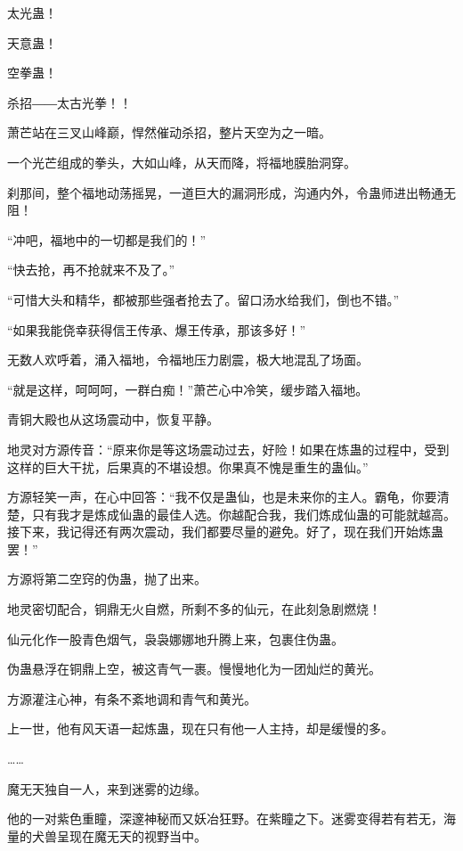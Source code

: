 
\begin{this_body}

太光蛊！

天意蛊！

空拳蛊！

杀招――太古光拳！！

萧芒站在三叉山峰巅，悍然催动杀招，整片天空为之一暗。

一个光芒组成的拳头，大如山峰，从天而降，将福地膜胎洞穿。

刹那间，整个福地动荡摇晃，一道巨大的漏洞形成，沟通内外，令蛊师进出畅通无阻！

“冲吧，福地中的一切都是我们的！”

“快去抢，再不抢就来不及了。”

“可惜大头和精华，都被那些强者抢去了。留口汤水给我们，倒也不错。”

“如果我能侥幸获得信王传承、爆王传承，那该多好！”

无数人欢呼着，涌入福地，令福地压力剧震，极大地混乱了场面。

“就是这样，呵呵呵，一群白痴！”萧芒心中冷笑，缓步踏入福地。

青铜大殿也从这场震动中，恢复平静。

地灵对方源传音：“原来你是等这场震动过去，好险！如果在炼蛊的过程中，受到这样的巨大干扰，后果真的不堪设想。你果真不愧是重生的蛊仙。”

方源轻笑一声，在心中回答：“我不仅是蛊仙，也是未来你的主人。霸龟，你要清楚，只有我才是炼成仙蛊的最佳人选。你越配合我，我们炼成仙蛊的可能就越高。接下来，我记得还有两次震动，我们都要尽量的避免。好了，现在我们开始炼蛊罢！”

方源将第二空窍的伪蛊，抛了出来。

地灵密切配合，铜鼎无火自燃，所剩不多的仙元，在此刻急剧燃烧！

仙元化作一股青色烟气，袅袅娜娜地升腾上来，包裹住伪蛊。

伪蛊悬浮在铜鼎上空，被这青气一裹。慢慢地化为一团灿烂的黄光。

方源灌注心神，有条不紊地调和青气和黄光。

上一世，他有风天语一起炼蛊，现在只有他一人主持，却是缓慢的多。

……

魔无天独自一人，来到迷雾的边缘。

他的一对紫色重瞳，深邃神秘而又妖冶狂野。在紫瞳之下。迷雾变得若有若无，海量的犬兽呈现在魔无天的视野当中。


\end{this_body}
